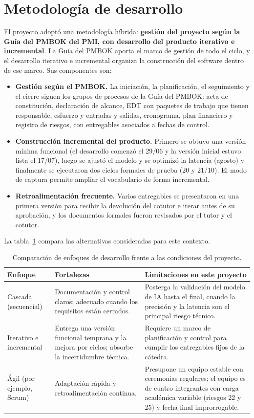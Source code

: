 \section{Metodología de desarrollo}

El proyecto adoptó una metodología híbrida: \textbf{gestión del proyecto según la Guía del PMBOK del PMI, con desarrollo del producto iterativo e incremental}. La Guía del PMBOK aporta el marco de gestión de todo el ciclo, y el desarrollo iterativo e incremental organiza la construcción del software dentro de ese marco. Sus componentes son:
\begin{itemize}
  \item \textbf{Gestión según el PMBOK.} La iniciación, la planificación, el seguimiento y el cierre siguen los grupos de procesos de la Guía del PMBOK: acta de constitución, declaración de alcance, EDT con paquetes de trabajo que tienen responsable, esfuerzo y entradas y salidas, cronograma, plan financiero y registro de riesgos, con entregables asociados a fechas de control.
  \item \textbf{Construcción incremental del producto.} Primero se obtuvo una versión mínima funcional (el desarrollo comenzó el 29/06 y la versión inicial estuvo lista el 17/07), luego se ajustó el modelo y se optimizó la latencia (agosto) y finalmente se ejecutaron dos ciclos formales de prueba (20 y 21/10). El modo de captura permite ampliar el vocabulario de forma incremental.
  \item \textbf{Retroalimentación frecuente.} Varios entregables se presentaron en una primera versión para recibir la devolución del cotutor e iterar antes de su aprobación, y los documentos formales fueron revisados por el tutor y el cotutor.
\end{itemize}

La tabla~\ref{tab:metodologias} compara las alternativas consideradas para este contexto.

\begin{table}[htbp]
\centering
\caption{Comparación de enfoques de desarrollo frente a las condiciones del proyecto.}\label{tab:metodologias}
\footnotesize
\begin{tabularx}{\textwidth}{@{}p{2.6cm}XX@{}}
\toprule
\textbf{Enfoque} & \textbf{Fortalezas} & \textbf{Limitaciones en este proyecto} \\
\midrule
Cascada (secuencial) & Documentación y control claros; adecuado cuando los requisitos están cerrados. & Posterga la validación del modelo de IA hasta el final, cuando la precisión y la latencia son el principal riesgo técnico. \\
Iterativo e incremental & Entrega una versión funcional temprana y la mejora por ciclos; absorbe la incertidumbre técnica. & Requiere un marco de planificación y control para cumplir los entregables fijos de la cátedra. \\
Ágil (por ejemplo, Scrum) & Adaptación rápida y retroalimentación continua. & Presupone un equipo estable con ceremonias regulares; el equipo es de cuatro integrantes con carga académica variable (riesgos 22 y 25) y fecha final improrrogable. \\
\bottomrule
\end{tabularx}
\end{table}

